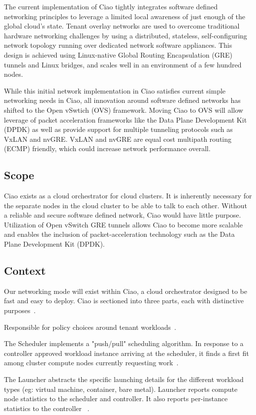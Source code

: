 \documentclass[10pt,onecolumn,journal,draftclsnofoot]{IEEEtran}
\begin{document}
The current implementation of Ciao tightly integrates software defined
networking principles to leverage a limited local awareness of just enough of
the global cloud's state. Tenant overlay networks are used to overcome
traditional hardware networking challenges by using a distributed, stateless,
self-configuring network topology running over dedicated network software
appliances. This design is achieved using Linux-native Global Routing
Encapsulation (GRE) tunnels and Linux bridges, and scales well in an environment
of a few hundred nodes.

While this initial network implementation in Ciao satisfies current simple
networking needs in Ciao, all innovation around software defined networks has
shifted to the Open vSwtich (OVS) framework. Moving Ciao to OVS will allow
leverage of packet acceleration frameworks like the Data Plane Development Kit
(DPDK) as well as provide support for multiple tunneling protocols such as VxLAN
and nvGRE. VxLAN and nvGRE are equal cost multipath routing (ECMP) friendly,
which could increase network performance overall.

\subsection{Scope}

Ciao exists as a cloud orchestrator for cloud clusters. It is inherently necessary
for the separate nodes in the cloud cluster to be able to talk to each other.
Without a reliable and secure software defined network, Ciao would have little
purpose. Utilization of Open vSwitch GRE tunnels allows Ciao to become more
scalable and enables the inclusion of packet-acceleration technology such as the
Data Plane Development Kit (DPDK).

\subsection{Context}

Our networking mode will exist within Ciao, a cloud orchestrator designed to be
fast and easy to deploy. Ciao is sectioned into three parts, each with
distinctive purposes~\cite{ciao}.

\begin{description}[leftmargin=12em,style=nextline]
	\item[Controller]
		Responsible for policy choices around tenant
		workloads~\cite{ciao}.
	\item[Scheduler]
		The Scheduler implements a "push/pull" scheduling algorithm. In
		response to a controller approved workload instance arriving at
		the scheduler, it finds a first fit among cluster compute nodes
		currently requesting work~\cite{ciao}.
	\item[Launcher]
		The Launcher abstracts the specific launching details for the
		different workload types (eg: virtual machine, container, bare
		metal). Launcher reports compute node statistics to the
		scheduler and controller. It also reports per-instance
		statistics to the controller ~\cite{ciao}.
\end{description}
\end{document}
